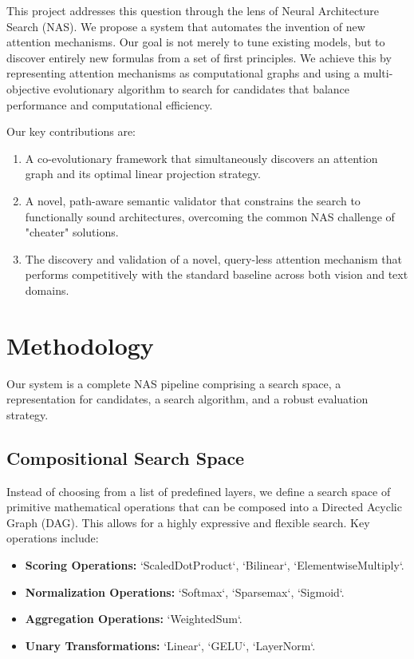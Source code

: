 \documentclass[11pt, a4paper]{article}
\begin{document}
This project addresses this question through the lens of Neural Architecture Search (NAS). We propose a system that automates the invention of new attention mechanisms. Our goal is not merely to tune existing models, but to discover entirely new formulas from a set of first principles. We achieve this by representing attention mechanisms as computational graphs and using a multi-objective evolutionary algorithm to search for candidates that balance performance and computational efficiency.

Our key contributions are:
\begin{enumerate}
    \item A co-evolutionary framework that simultaneously discovers an attention graph and its optimal linear projection strategy.
    \item A novel, path-aware semantic validator that constrains the search to functionally sound architectures, overcoming the common NAS challenge of "cheater" solutions.
    \item The discovery and validation of a novel, query-less attention mechanism that performs competitively with the standard baseline across both vision and text domains.
\end{enumerate}

\section{Methodology}
Our system is a complete NAS pipeline comprising a search space, a representation for candidates, a search algorithm, and a robust evaluation strategy.

\subsection{Compositional Search Space}
Instead of choosing from a list of predefined layers, we define a search space of primitive mathematical operations that can be composed into a Directed Acyclic Graph (DAG). This allows for a highly expressive and flexible search. Key operations include:
\begin{itemize}
    \item \textbf{Scoring Operations:} `ScaledDotProduct`, `Bilinear`, `ElementwiseMultiply`.
    \item \textbf{Normalization Operations:} `Softmax`, `Sparsemax`, `Sigmoid`.
    \item \textbf{Aggregation Operations:} `WeightedSum`.
    \item \textbf{Unary Transformations:} `Linear`, `GELU`, `LayerNorm`.
\end{itemize}
\end{document}
